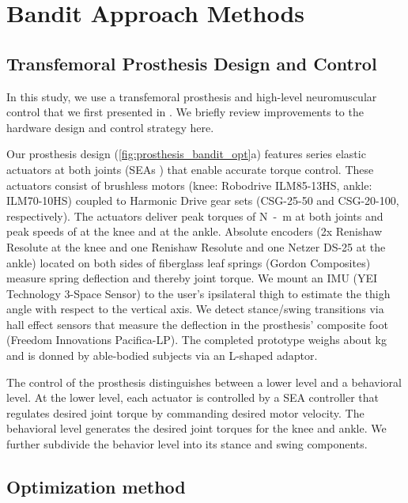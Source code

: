 \section{Bandit Approach Methods}\label{sec:bandit_methods}


\subsection{Transfemoral Prosthesis Design and Control}
In this study, we use a transfemoral prosthesis and high-level neuromuscular
control that we first presented in \citet{thatte2016toward}. We briefly review
improvements to the hardware design and control strategy here.

Our prosthesis design (\cref{fig:prosthesis_bandit_opt}a) features series
elastic actuators at both joints (SEAs \citep{pratt1995series}) that enable
accurate torque control. These actuators consist of brushless motors (knee:
Robodrive ILM85-13HS, ankle: ILM70-10HS) coupled to Harmonic Drive gear sets
(CSG-25-50 and CSG-20-100, respectively).  The actuators deliver peak torques of
\unit[170]{N-m} at both joints and peak speeds of  at the
knee and  at the ankle. Absolute encoders (2x Renishaw
Resolute at the knee and one Renishaw Resolute and one Netzer DS-25 at the
ankle) located on both sides of fiberglass leaf springs (Gordon Composites)
measure spring deflection and thereby joint torque. We mount an IMU (YEI
Technology 3-Space Sensor) to the user's ipsilateral thigh to estimate the thigh
angle with respect to the vertical axis.  We detect stance/swing transitions via
hall effect sensors that measure the deflection in the prosthesis' composite
foot (Freedom Innovations Pacifica-LP).  The completed prototype weighs about
\unit[6]{kg} and is donned by able-bodied subjects via an L-shaped adaptor.

The control of the prosthesis distinguishes between a lower level and a
behavioral level. At the lower level, each actuator is controlled by a SEA
controller \citep{schepelmann2012development} that regulates desired joint
torque by commanding desired motor velocity. The behavioral level generates the
desired joint torques for the knee and ankle. We further subdivide the behavior
level into its stance and swing components.

\subsection{Optimization method}\label{sec:bandit_optimization}

